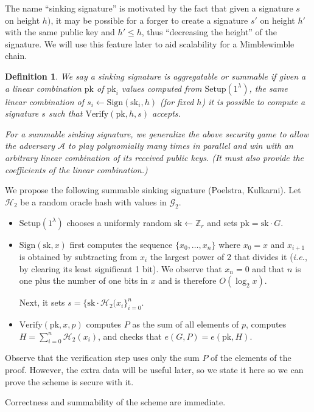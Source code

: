 \documentclass[letterpaper]{article}
\newtheorem{defn}{Definition}
\newcommand{\Setup}{\mathrm{Setup}}
\newcommand{\Sign}{\mathrm{Sign}}
\newcommand{\Verify}{\mathrm{Verify}}
\newcommand{\sk}{\mathrm{sk}}
\newcommand{\pk}{\mathrm{pk}}
\newcommand{\hash}{\mathcal{H}_2}
\begin{document}
The name ``sinking signature'' is motivated by the fact that given a signature
$s$ on height $h)$, it may be possible for a forger to create a signature $s'$
on height $h'$ with the same public key and $h' \leq h$, thus ``decreasing the
height'' of the signature. We will use this feature later to aid scalability for
a Mimblewimble chain.

\begin{defn} We say a sinking signature is \emph{aggregatable} or \emph{summable}
if given a a linear combination $\pk$ of $\pk_i$ values computed from $\Setup(1^\lambda)$,
the same linear combination of $s_i\gets\Sign(\sk_i, h)$ (for fixed $h$) it
is possible to compute a signature $s$ such that $\Verify(\pk, h, s)$ accepts.

For a summable sinking signature, we generalize the above security game to allow
the adversary $\mathcal{A}$ to play polynomially many times in parallel and win
with an arbitrary linear combination of its received public keys. (It must also
provide the coefficients of the linear combination.)
\label{homodef}
\end{defn}

We propose the following summable sinking signature (Poelstra, Kulkarni).
Let $\hash$ be a random oracle hash with values in $\mathcal{G}_2$.
\begin{itemize}
\item $\Setup(1^\lambda)$ chooses a uniformly random $\sk\gets\mathbb{Z}_r$
and sets $\pk = \sk\cdot G$.
\item $\Sign(\sk, x)$ first computes the sequence $\{x_0,\ldots,x_n\}$
where $x_0 = x$ and $x_{i+1}$ is obtained by subtracting from $x_i$ the
largest power of 2 that divides it (\emph{i.e.}, by clearing its least
significant 1 bit). We observe that $x_n = 0$ and that $n$ is one plus
the number of one bits in $x$ and is therefore $O(\log_2x)$.

Next, it sets $s = \{\sk\cdot \hash(x_i\}_{i=0}^n$.
\item $\Verify(\pk, x, p)$ computes $P$ as the sum of all elements of $p$,
computes $H = \sum_{i=0}^n \hash(x_i)$, and checks that $e(G, P) = e(\pk, H)$.
\end{itemize}
Observe that the verification step uses only the sum $P$ of the elements
of the proof. However, the extra data will be useful later, so we state
it here so we can prove the scheme is secure with it.

Correctness and summability of the scheme are immediate.
\end{document}
